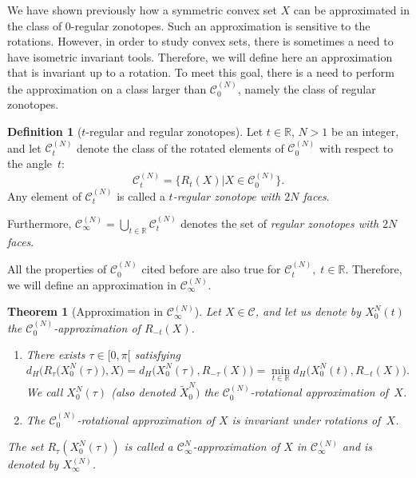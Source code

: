 \documentclass[numbers,compress,v1.0.1]{vmsta}
\newtheorem{theorem}{Theorem}
\theoremstyle{definition}
\newtheorem{definition}{Definition}
\begin{document}
We have shown previously how a symmetric convex set $X$ can be
approximated in the class of $0$-regular zonotopes. Such an
approximation is sensitive to the rotations. However, in order to study
convex sets, there is sometimes a need to have isometric invariant
tools. Therefore, we will define here an approximation that is
invariant up to a rotation. To meet this goal, there is a need to
perform the approximation on a class larger than $\mathcal{C}^{(N)}_0$,
namely the class of regular zonotopes.

\begin{definition}[$t$-regular and regular zonotopes]
Let $t\in\mathbb{R}$, $N>1$ be an integer, and let $\mathcal
{C}^{(N)}_t$ denote the class of the rotated elements of $\mathcal
{C}^{(N)}_0$ with respect to the angle~$t$:
%
\begin{equation*}
\mathcal{C}^{(N)}_t=\bigl\lbrace R_t(X)\bigl\vert X
\in\mathcal{C}^{(N)}_0\bigr\rbrace.
\end{equation*}
%
Any element of $\mathcal{C}^{(N)}_t$ is called a \textit{$t$-regular
zonotope with $2N$ faces}.

Furthermore, $\mathcal{C}^{(N)}_\infty=\bigcup_{t\in\mathbb{R}} \mathcal
{C}^{(N)}_t$ denotes the set of \textit{regular zonotopes with $2N$ faces}.
\end{definition}
%
All the properties of $\mathcal{C}^{(N)}_0$ cited before are also true
for $\mathcal{C}^{(N)}_t,\;t\in\mathbb{R}$. Therefore, we will define
an approximation in $\mathcal{C}^{(N)}_\infty$.

\begin{theorem}[Approximation in $\mathcal{C}^{(N)}_\infty$]
Let $X\in\mathcal{C}$, and let us denote by $X_0^{N}(t)$ the $\mathcal
{C}^{(N)}_0$-approximation of $R_{-t}(X)$.
%
\begin{enumerate}
%
\item There exists $\tau\in[0,\pi[$ satisfying
%
\begin{equation}
d_H\bigl(R_{\tau}\bigl(X_0^{N}(
\tau)\bigr),X\bigr)=d_H\bigl(X_0^{N}(
\tau),R_{-\tau}(X)\bigr)=\min_{t\in\mathbb{R}}d_H
\bigl(X_0^{N}(t),R_{-t}(X)\bigr). \label{eq:thm2:defN-infty}
\end{equation}
%
We call $X_0^{N}(\tau)$ \textup{(}also denoted $\tilde{X}_0^{N})$ the
\textit{$\mathcal{C}^{(N)}_0$-rotational approximation of~$X$}.
%
\item The $\mathcal{C}^{(N)}_0$-rotational approximation of $X$ is
invariant under rotations of~$X$.
\end{enumerate}
%
The set $ R_{\tau}(X_0^{N}(\tau))$ is called a \textit{$\mathcal
{C}^{N}_\infty$-approximation of $X$ in $\mathcal{C}_{\infty}^{(N)}$}
and is denoted by $X^{(N)}_\infty$.
\label{thm:2approxuptorot}
\end{theorem}
\end{document}
